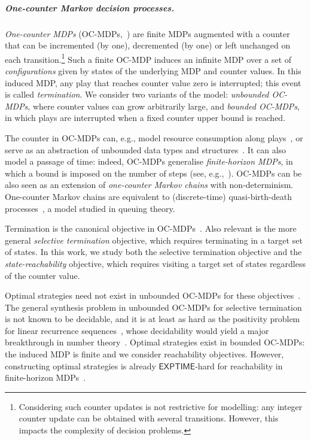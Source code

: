 \documentclass[a4paper,UKenglish,cleveref,autoref,thm-restate,colorlinks]{lipics-v2021}
\newcommand{\exptime}{\textsf{EXPTIME}}
\begin{document}
\subparagraph*{One-counter Markov decision processes.}
\textit{One-counter MDPs} (OC-MDPs,~\cite{DBLP:conf/soda/BrazdilBEKW10}) are finite MDPs augmented with a counter that can be incremented (by one), decremented (by one) or left unchanged on each transition.\footnote{
  Considering such counter updates is not restrictive for modelling: any integer counter update can be obtained with several transitions.
  However, this impacts the complexity of decision problems.}
Such a finite OC-MDP induces an infinite MDP over a set of \textit{configurations} given by states of the underlying MDP and counter values.
In this induced MDP, any play that reaches counter value zero is interrupted; this event is called \textit{termination}.
We consider two variants of the model: \textit{unbounded OC-MDPs}, where counter values can grow arbitrarily large, and \textit{bounded OC-MDPs}, in which plays are interrupted when a fixed counter upper bound is reached.

The counter in OC-MDPs can, e.g., model resource consumption along plays~\cite{DBLP:conf/soda/BrazdilBEKW10}, or serve as an abstraction of unbounded data types and structures~\cite{DBLP:conf/cav/BrazdilKK11}. It can also model a passage of time: indeed, OC-MDPs generalise \textit{finite-horizon MDPs}, in which a bound is imposed on the number of steps (see, e.g.,~\cite{DBLP:conf/icalp/BalajiK0PS19}).
OC-MDPs can be also seen as an extension of \textit{one-counter Markov chains} with non-determinism.
One-counter Markov chains are equivalent to (discrete-time) quasi-birth-death processes~\cite{DBLP:journals/pe/EtessamiWY10}, a model studied in queuing theory.

Termination is the canonical objective in OC-MDPs~\cite{DBLP:conf/soda/BrazdilBEKW10}.
Also relevant is the more general \textit{selective termination} objective, which requires terminating in a target set of states.
In this work, we study both the selective termination objective and the \textit{state-reachability} objective, which requires visiting a target set of states regardless of the counter value.

Optimal strategies need not exist in unbounded OC-MDPs for these objectives~\cite{DBLP:journals/iandc/BrazdilBEK13}.
The general synthesis problem in unbounded OC-MDPs for selective termination is not known to be decidable, and it is at least as hard as the positivity problem for linear recurrence sequences~\cite{DBLP:journals/theoretics/PiribauerB24}, whose decidability would yield a major breakthrough in number theory~\cite{DBLP:conf/soda/OuaknineW14}.
Optimal strategies exist in bounded OC-MDPs: the induced MDP is finite and we consider reachability objectives.
However, constructing optimal strategies is already $\exptime$-hard for reachability in finite-horizon MDPs~\cite{DBLP:conf/icalp/BalajiK0PS19}.
\end{document}

